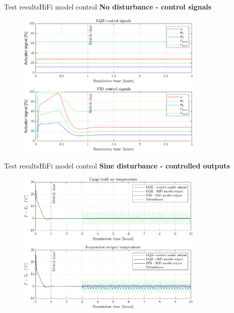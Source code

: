 
\begin{frame}{Test results}{HiFi model control}
	 \textbf{No disturbance - control signals}
	\begin{figure}[H]
		\centering
		\includegraphics[width=0.8\textwidth]{../Graphics/fig_inputs_noDist.png}
	\end{figure}
\end{frame}


\begin{frame}{Test results}{HiFi model control}
	\textbf{Sine disturbance - controlled outputs}
	\begin{figure}[H]
		\centering
		\includegraphics[width=0.8\textwidth]{../Graphics/fig_LQRvsKresten_sineDist.png}
	\end{figure} 
\end{frame}


